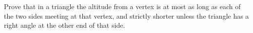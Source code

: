 Prove that in a triangle the altitude from a vertex is at most as long as each of the two sides meeting at that vertex, and strictly shorter unless the triangle has a right angle at the other end of that side.
